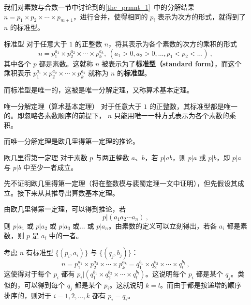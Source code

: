 
我们对素数与合数一节中讨论到的\autoref{the_prmnt_1}~中的分解结果 $n = p_1 \times p_2\times \cdots \times p_{m+1}$，进行合并，使得相同的 $p_i$ 表示为次方的形式，就得到了 $n$ 的标准型。
\begin{definition}{标准型}
对于任意大于 $1$ 的正整数 $n$，将其表示为各个素数的次方的乘积的形式
\begin{equation}
n = p_1^{a_1} \times p_2^{a_2} \times \cdots \times p_k^{a_k}, ~ (a_1 > 0, a_2 > 0 , \dots, p_1 < p_2<\dots) ~,
\end{equation}
其中各个 $p$ 都是素数。这就称 $n$ 被表示为了\textbf{标准型（standard form）}，而这个乘积表示 $p_1^{a_1} \times p_2^{a_2} \times \cdots \times p_k^{a_k}$ 就称为 $n$ 的\textbf{标准型}。
\end{definition}

而标准型是唯一的，这被是唯一分解定理，又称算术基本定理。
\begin{theorem}{唯一分解定理（算术基本定理）}
对于任意大于 $1$ 的正整数，其标准型都是唯一的。即忽略各素数顺序的前提下， $n$ 只能用唯一一种方式表示为各个素数的乘积。
\end{theorem}

而唯一分解定理是欧几里得第一定理的推论。
\begin{theorem}{欧几里得第一定理}
对于素数 $p$ 与两正整数 $a$、$b$，若 $p|ab$，则 $p|a$ 或 $p|b$，即 $p|a$ 与 $p|b$ 中至少一者成立。
\end{theorem}

先不证明欧几里得第一定理（将在整数模与裴蜀定理一文中证明），但先假设其成立。接下来从其推导出算数基本定理。

由欧几里得第一定理，可以得到推论，若
\begin{equation}
p | (a_1 a_2 \cdots a_n) ~,
\end{equation}
则 $p | a_1$ 或 $p | a_2$ 或 $p|a_3$ 或... 或 $p|a_n$。由素数的定义可以立刻得出，若各 $a_i$ 都是素数，则 $p$ 是 $a_i$ 中的一者。

考虑 $n$ 有标准型 $\{(p_i, a_i)\}$ 与  $\{(q_j, b_j)\}$：
\begin{equation}
n = p_1^{a_1}\times p_2^{a_2} \times \cdots \times p_k^{a_k} = q_1^{b_1} \times q_2^{b_2} \times \cdots \times q_l^{b_l} ~,
\end{equation}
这使得对于每个 $p_i$ 都有 $p_i | (q_1^{b_1} \times q_2^{b_2} \times \cdots \times q_l^{b_l})$。这说明每个 $p_i$ 都是某个 $q_j$。类似的，可以得到每个 $q_j$ 都是某个 $p_i$。这就说明 $k = l$。而由于都是按递增的顺序排序的，则对于 $i = 1,2,\dots, k$ 都有 $p_i = q_i$。

